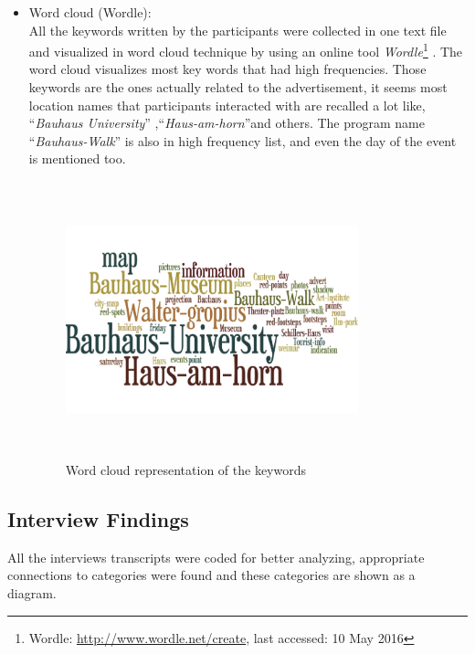 \begin{itemize}
\begin{enumerate}
\end{enumerate}

\item Word cloud (Wordle): \\
All the keywords written by the participants were collected in one text file and visualized in word cloud technique by using an online tool \emph{Wordle}\footnote{Wordle: \url{http://www.wordle.net/create}, last accessed: 10 May 2016} .
The word cloud visualizes most key words that had high frequencies. Those keywords are the ones actually related to the advertisement, it seems most location names that participants interacted with are recalled a lot like, ``\emph{Bauhaus University}'' ,``\emph{Haus-am-horn}''and others. The program name ``\emph{Bauhaus-Walk}'' is also in high frequency list, and even the day of the event is mentioned too.


\begin{figure}[H]
\centering
\includegraphics[width=0.8\textwidth,height=8cm]{Figures/6/wordle}%
 \caption{Word cloud representation of the keywords}%
 \label{fig:wordle}%
\end{figure}


\end{itemize}

\subsection{Interview Findings}
All the interviews transcripts were coded for better analyzing, appropriate connections to categories were found and these categories are shown as a diagram.

